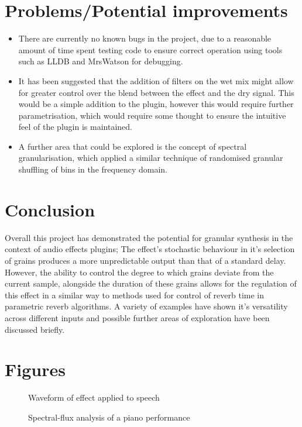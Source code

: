 \documentclass[titlepage]{scrartcl}
\begin{document}
\section{Problems/Potential improvements}
\begin{itemize}
    \item There are currently no known bugs in the project, due to a reasonable
        amount of time spent testing code to ensure correct operation using
        tools such as LLDB and MrsWatson for debugging.
    \item It has been suggested that the addition of filters on the wet mix
        might allow for greater control over the blend between the effect and
        the dry signal. This would be a simple addition to the plugin, however
        this would require further parametrisation, which would require some
        thought to ensure the intuitive feel of the plugin is maintained.
    \item A further area that could be explored is the concept of spectral
        granularisation, which applied a similar technique of randomised
        granular shuffling of bins in the frequency domain.
\end{itemize}

\section{Conclusion}
Overall this project has demonstrated the potential for granular synthesis in
the context of audio effects plugins; The effect's stochastic behaviour in it's
selection of grains produces a more unpredictable output than that of a
standard delay. However, the ability to control the degree to which grains
deviate from the current sample, alongside the duration of these grains allows
for the regulation of this effect in a similar way to methods used for control
of reverb time in parametric reverb algorithms. A variety of examples have shown it's
versatility across different inputs and possible further areas of exploration
have been discussed briefly.

\section{Figures}
\begin{figure}[H]
    \caption{Waveform of effect applied to speech}
    \label{Temporal}
\end{figure}
\begin{figure}[H]
    \caption{Spectral-flux analysis of a piano performance}
    \label{PianoFlux}
\end{figure}
\pagebreak
\printbibliography
\end{document}
